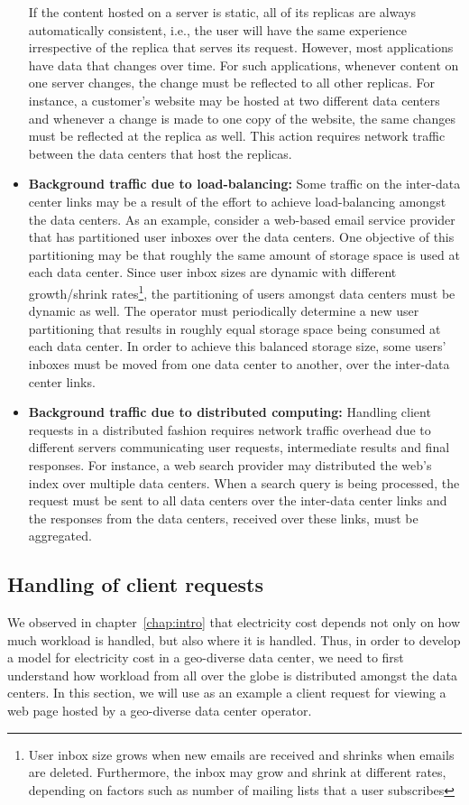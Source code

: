 \begin{itemize}
If the content hosted on a server is static, all of its replicas are always automatically consistent, i.e., the user will have the same experience irrespective of the replica that serves its request. However, most applications have data that changes over time. For such applications, whenever content on one server changes, the change must be reflected to all other replicas. For instance, a customer's website may be hosted at two different data centers and whenever a change is made to one copy of the website, the same changes must be reflected at the replica as well. This action requires network traffic between the data centers that host the replicas. 
\item \textbf{Background traffic due to load-balancing:} Some traffic on the inter-data center links may be a result of the effort to achieve load-balancing amongst the data centers. As an example, consider a web-based email service provider that has partitioned user inboxes over the data centers. One objective of this partitioning may be that roughly the same amount of storage space is used at each data center. Since user inbox sizes are dynamic with different growth/shrink rates\footnote{User inbox size grows when new emails are received and shrinks when emails are deleted. Furthermore, the inbox may grow and shrink at different rates, depending on factors such as number of mailing lists that a user subscribes}, the partitioning of users amongst data centers must be dynamic as well. The operator must periodically determine a new user partitioning that results in roughly equal storage space being consumed at each data center. In order to achieve this balanced storage size, some users' inboxes must be moved from one data center to another, over the inter-data center links.
\item \textbf{Background traffic due to distributed computing:} Handling client requests in a distributed fashion requires network traffic overhead due to different servers communicating user requests, intermediate results and final responses. For instance, a web search provider may distributed the web's index over multiple data centers. When a search query is being processed, the request must be sent to all data centers over the inter-data center links and the responses from the data centers, received over these links,  must be aggregated.
\end{itemize}

\subsection{Handling of client requests} 
We observed in chapter~\ref{chap:intro} that electricity cost depends not only on how much workload is handled, but also where it is handled. Thus, in order to develop a model for electricity cost in a geo-diverse data center, we need to first understand how workload from all over the globe is distributed amongst the data centers. In this section, we will use as an example a client request for viewing a web page hosted by a geo-diverse data center operator. 

